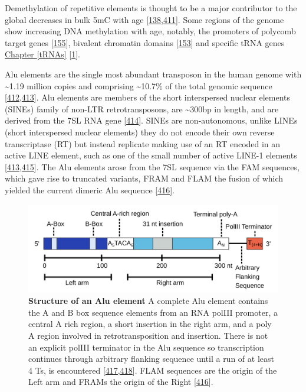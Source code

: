\documentclass[
]{book}
\begin{document}
Demethylation of repetitive elements is thought to be a major contributor to the global decreases in bulk 5mC with age {[}\protect\hyperlink{ref-Wilson1983}{138},\protect\hyperlink{ref-Bollati2010}{411}{]}.
Some regions of the genome show increasing DNA methylation with age, notably, the promoters of polycomb target genes {[}\protect\hyperlink{ref-Teschendorff2010}{155}{]}, bivalent chromatin domains {[}\protect\hyperlink{ref-Rakyan2010}{153}{]} and specific tRNA genes \protect\hyperlink{tRNAs}{Chapter \ref{tRNAs}} {[}\protect\hyperlink{ref-Acton2020}{1}{]}.

Alu elements are the single most abundant transposon in the human genome with \textasciitilde1.19 million copies and comprising \textasciitilde10.7\% of the total genomic sequence {[}\protect\hyperlink{ref-Dewannieux2003}{412},\protect\hyperlink{ref-Deininger2011}{413}{]}.
Alu elements are members of the short interspersed nuclear elements (SINEs) family of non-LTR retrotransposons, are \textasciitilde300bp in length, and are derived from the 7SL RNA gene {[}\protect\hyperlink{ref-Ullu1984}{414}{]}.
SINEs are non-autonomous, unlike LINEs (short interspersed nuclear elements) they do not encode their own reverse transcriptase (RT) but instead replicate making use of an RT encoded in an active LINE element, such as one of the small number of active LINE-1 elements {[}\protect\hyperlink{ref-Deininger2011}{413},\protect\hyperlink{ref-Cordaux2009}{415}{]}.
The Alu elements arose from the 7SL sequence via the FAM sequences, which gave rise to truncated variants, FRAM and FLAM the fusion of which yielded the current dimeric Alu sequence {[}\protect\hyperlink{ref-Quentin1992}{416}{]}.

\begin{figure}

{\centering \includegraphics[width=0.9\linewidth]{./figs/AluStructure} 

}

\caption{\textbf{Structure of an Alu element} A complete Alu element contains the A and B box sequence elements from an RNA polIII promoter, a central A rich region, a short insertion in the right arm, and a poly A region involved in retrotransposition and insertion. There is not an explicit polIII terminator in the Alu sequence so transcription continues through arbitrary flanking sequence until a run of at least 4 Ts, is encountered {[}\protect\hyperlink{ref-Chen2008}{417},\protect\hyperlink{ref-Batzer2002}{418}{]}. FLAM sequences are the origin of the Left arm and FRAMs the origin of the Right {[}\protect\hyperlink{ref-Quentin1992}{416}{]}.}\label{fig:AluStruct}
\end{figure}
\end{document}

